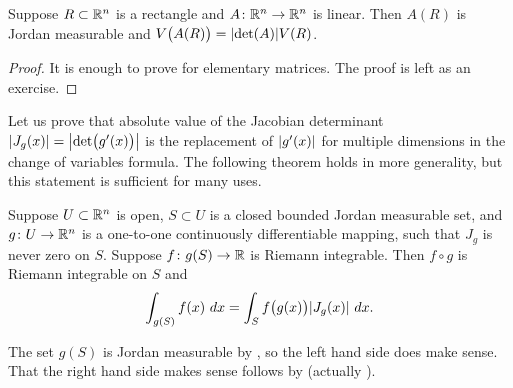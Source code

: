\begin{prop} \label{prop:volrectdet}
Suppose $R \subset {\mathbb{R}}^n$ is a rectangle
and $A \colon {\mathbb{R}}^n \to {\mathbb{R}}^n$ is linear.  Then
$A(R)$ is Jordan measurable and $V\bigl(A(R)\bigr) = \lvert {\det (A)} \rvert V(R)$.
\end{prop}

\begin{proof}
It is enough to prove for elementary matrices.  The proof is left as an
exercise.
\end{proof}

Let us prove that
absolute value of the Jacobian determinant
$\lvert {J_g(x)} \rvert = \bigl\lvert {\det \bigl(g'(x)\bigr)} \bigr\rvert$
is the replacement of $\lvert {g'(x)} \rvert$ for multiple
dimensions in the change of variables formula.
The following theorem holds in more generality,
but this statement is sufficient for many uses.

\begin{thm}
Suppose $U \subset {\mathbb{R}}^n$ is open,
$S \subset U$ is a closed bounded Jordan measurable set, and
$g \colon U \to {\mathbb{R}}^n$ is a one-to-one
continuously differentiable mapping, such that
$J_g$ is never zero on $S$.
Suppose $f \colon g(S) \to {\mathbb{R}}$ is Riemann integrable.
Then $f \circ g$ is Riemann integrable on $S$ and
\begin{equation*}
\int_{g(S)} f(x) ~ dx = 
\int_S f\bigl(g(x)\bigr) \lvert {J_g(x)} \rvert ~ dx .
\end{equation*}
\end{thm}

The set $g(S)$ is Jordan measurable by ,
so the left hand side does make sense.
That the right hand side makes sense follows by
 (actually
).


